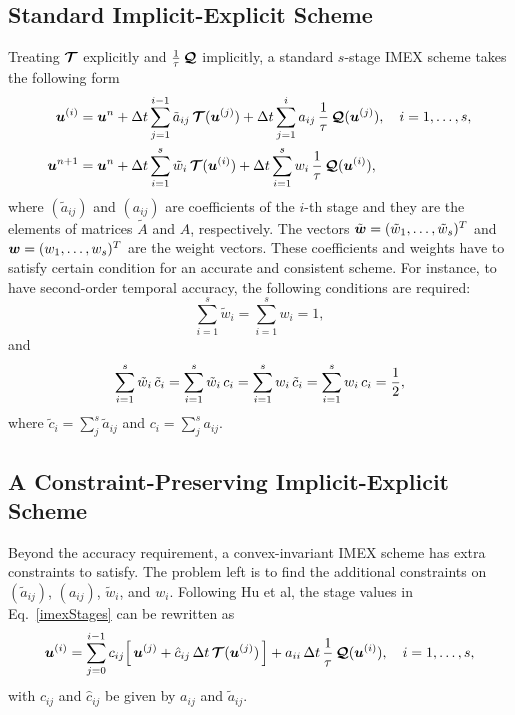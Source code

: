 \subsection{Standard Implicit-Explicit Scheme}
Treating $\boldsymbol{\mathcal{T}}$ explicitly and $\frac{1}{\tau}\,\boldsymbol{\mathcal{Q}}$ implicitly, a standard $s$-stage IMEX scheme takes the following form \cite{pareschiRusso_2005}
\begin{align}
  \boldsymbol{u}^{(i)}
  &=\boldsymbol{u}^{n}
  +\Delta t\sum_{j=1}^{i-1}\tilde{a}_{ij}\,\boldsymbol{\mathcal{T}}(\boldsymbol{u}^{(j)})
  +\Delta t\sum_{j=1}^{i}a_{ij}\,\frac{1}{\tau}\,\boldsymbol{\mathcal{Q}}(\boldsymbol{u}^{(j)}),
  \quad i=1,\ldots,s, \label{imexStages} \\
  \boldsymbol{u}^{n+1}
  &=\boldsymbol{u}^{n}
  +\Delta t\sum_{i=1}^{s}\tilde{w}_{i}\,\boldsymbol{\mathcal{T}}(\boldsymbol{u}^{(i)})
  +\Delta t\sum_{i=1}^{s}w_{i}\,\frac{1}{\tau}\,\boldsymbol{\mathcal{Q}}(\boldsymbol{u}^{(i)}), \label{imexIntermediate} 
\end{align}
where  $(\tilde{a}_{ij})$ and $(a_{ij})$ are coefficients of the $i$-th stage and they are the elements of matrices $\tilde{A}$ and $A$, respectively.
The vectors $\tilde{\boldsymbol{w}}=(\tilde{w}_{1},\ldots,\tilde{w}_{s})^{T}$ and $\boldsymbol{w}=(w_{1},\ldots,w_{s})^{T}$ are the weight vectors.
These coefficients and weights have to satisfy certain condition for an accurate and consistent scheme.
For instance, to have second-order temporal accuracy, the following conditions are required:
\begin{equation}
  \sum_{i=1}^{s}\tilde{w}_{i}=\sum_{i=1}^{s}w_{i}=1,
  \label{orderConditions1}
\end{equation}
and
\begin{equation}
  \sum_{i=1}^{s}\tilde{w}_{i}\,\tilde{c}_{i}
  =\sum_{i=1}^{s}\tilde{w}_{i}\,c_{i}
  =\sum_{i=1}^{s}w_{i}\,\tilde{c}_{i}
  =\sum_{i=1}^{s}w_{i}\,c_{i}=\frac{1}{2}, 
  \label{orderConditions2}
\end{equation}
where $\tilde{c}_{i} = \sum_{j}^{s}\tilde{a}_{ij}$ and $c_{i}=\sum_{j}^{s}a_{ij}$.

\subsection{A Constraint-Preserving Implicit-Explicit Scheme}
Beyond the accuracy requirement, a convex-invariant IMEX scheme has extra constraints to satisfy.
The problem left is to find the additional constraints on $(\tilde{a}_{ij})$, $(a_{ij})$, $\tilde{w}_{i}$, and $w_{i}$.
Following Hu et al\cite{hu_etal_2018}, the stage values in Eq.~\eqref{imexStages} can be rewritten as
\begin{equation}
  \boldsymbol{u}^{(i)}
  =\sum_{j=0}^{i-1}c_{ij}\Big[\,\boldsymbol{u}^{(j)}+\hat{c}_{ij}\,\Delta t\,\boldsymbol{\mathcal{T}}(\boldsymbol{u}^{(j)})\,\Big]
  +a_{ii}\,\Delta t\,\frac{1}{\tau}\,\boldsymbol{\mathcal{Q}}(\boldsymbol{u}^{(i)}),\quad i=1,\ldots,s,
  \label{eq:imexStagesRewrite}
\end{equation}
with $c_{ij}$ and $\hat{c}_{ij}$ be given by $a_{ij}$ and $\tilde{a}_{ij}$.

